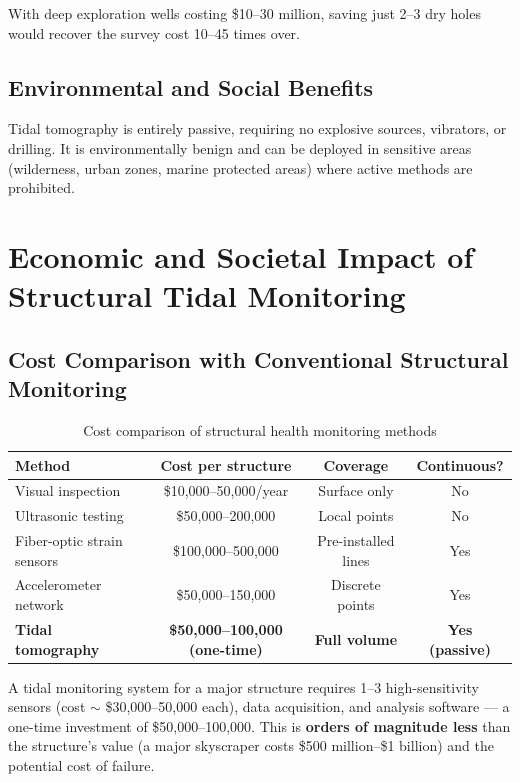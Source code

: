 \documentclass[12pt,a4paper]{article}
\theoremstyle{remark}
\begin{document}
	With deep exploration wells costing \$10–30 million, saving just 2–3 dry holes would recover the survey cost 10–45 times over.
	
	\subsection{Environmental and Social Benefits}
	
	Tidal tomography is entirely passive, requiring no explosive sources, vibrators, or drilling. It is environmentally benign and can be deployed in sensitive areas (wilderness, urban zones, marine protected areas) where active methods are prohibited.
	
	\section{Economic and Societal Impact of Structural Tidal Monitoring}
	\label{sec:structural-economics}
	
	\subsection{Cost Comparison with Conventional Structural Monitoring}
	
	\begin{table}[htbp]
		\centering
		\caption{Cost comparison of structural health monitoring methods}
		\label{tab:structural-costs}
		\small
		\begin{tabular}{lccc}
			\toprule
			\textbf{Method} & \textbf{Cost per structure} & \textbf{Coverage} & \textbf{Continuous?} \\
			\midrule
			Visual inspection & \$10,000–50,000/year & Surface only & No \\
			Ultrasonic testing & \$50,000–200,000 & Local points & No \\
			Fiber-optic strain sensors & \$100,000–500,000 & Pre-installed lines & Yes \\
			Accelerometer network & \$50,000–150,000 & Discrete points & Yes \\
			\textbf{Tidal tomography} & \textbf{\$50,000–100,000 (one-time)} & \textbf{Full volume} & \textbf{Yes (passive)} \\
			\bottomrule
		\end{tabular}
	\end{table}
	
	A tidal monitoring system for a major structure requires 1–3 high-sensitivity sensors (cost \(\sim\) \$30,000–50,000 each), data acquisition, and analysis software — a one-time investment of \$50,000–100,000. This is \textbf{orders of magnitude less} than the structure's value (a major skyscraper costs \$500 million–\$1 billion) and the potential cost of failure.
	
\end{document}
